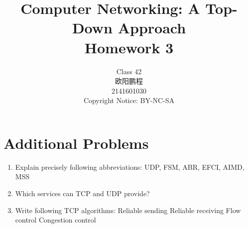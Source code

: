 \documentclass[]{article}
\title{Computer Networking: A Top-Down Approach \\ Homework 3}
\author{Class 42 \\ 欧阳鹏程 \\ 2141601030 \\ Copyright Notice: BY-NC-SA}
\begin{document}
\maketitle

\section{Additional Problems}
\begin{enumerate}
	\item Explain precisely following abbreviations:
	\subitem UDP, FSM, ABR, EFCI, AIMD, MSS
	
	
	\item Which services can TCP and UDP provide?
	
	
	\item Write following TCP algorithms:
	\subitem Reliable sending
	\subitem Reliable receiving
	\subitem Flow control
	\subitem Congestion control
\end{enumerate}
\end{document}
